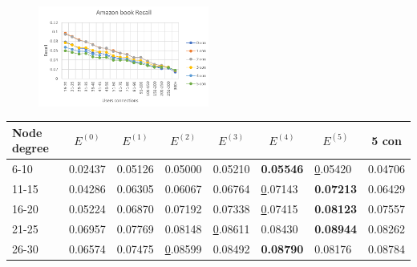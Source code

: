 \begin{figure}[h!]
    \includegraphics[width=0.5\textwidth]{figures/evaluation/amazon-book-recall.png}
    \centering
    \caption{}
    \label{}
\end{figure}


\begin{table}[]
    \centering
    \begin{tabular}{|l|l|l|l|l|l|l||l|}
        \hline
        Node degree & \multicolumn{1}{c|}{$E^{(0)}$} & \multicolumn{1}{c|}{$E^{(1)}$} & \multicolumn{1}{c|}{$E^{(2)}$} & \multicolumn{1}{c|}{$E^{(3)}$} & \multicolumn{1}{c|}{$E^{(4)}$} & \multicolumn{1}{c||}{$E^{(5)}$} & \multicolumn{1}{c|}{5 con} \\ \hline
        6-10        & 0.02437                        & 0.05126                        & 0.05000                        & 0.05210                        & \textbf{0.05546}               & {\ul 0.05420}                   & 0.04706                    \\ \hline
        11-15       & 0.04286                        & 0.06305                        & 0.06067                        & 0.06764                        & {\ul 0.07143}                  & \textbf{0.07213}                & 0.06429                    \\ \hline
        16-20       & 0.05224                        & 0.06870                        & 0.07192                        & 0.07338                        & {\ul 0.07415}                  & \textbf{0.08123}                & 0.07557                    \\ \hline
        21-25       & 0.06957                        & 0.07769                        & 0.08148                        & {\ul 0.08611}                  & 0.08430                        & \textbf{0.08944}                & 0.08262                    \\ \hline
        26-30       & 0.06574                        & 0.07475                        & {\ul 0.08599}                  & 0.08492                        & \textbf{0.08790}               & 0.08176                         & 0.08784                    \\ \hline

\end{tabular}
\end{table}
